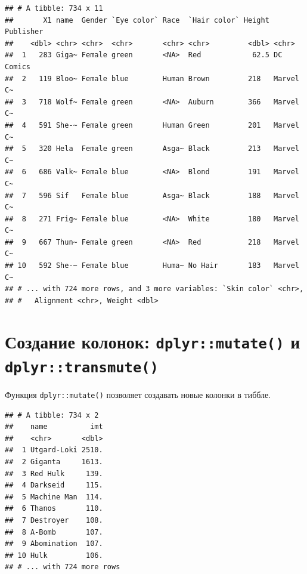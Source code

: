 \documentclass[]{book}
\newenvironment{Shaded}{\begin{snugshade}}{\end{snugshade}}
\newcommand{\KeywordTok}[1]{\textcolor[rgb]{0.13,0.29,0.53}{\textbf{#1}}}
\newcommand{\DataTypeTok}[1]{\textcolor[rgb]{0.13,0.29,0.53}{#1}}
\newcommand{\DecValTok}[1]{\textcolor[rgb]{0.00,0.00,0.81}{#1}}
\newcommand{\StringTok}[1]{\textcolor[rgb]{0.31,0.60,0.02}{#1}}
\newcommand{\OperatorTok}[1]{\textcolor[rgb]{0.81,0.36,0.00}{\textbf{#1}}}
\newcommand{\NormalTok}[1]{#1}
\begin{document}
\begin{verbatim}
## # A tibble: 734 x 11
##       X1 name  Gender `Eye color` Race  `Hair color` Height Publisher
##    <dbl> <chr> <chr>  <chr>       <chr> <chr>         <dbl> <chr>    
##  1   283 Giga~ Female green       <NA>  Red            62.5 DC Comics
##  2   119 Bloo~ Female blue        Human Brown         218   Marvel C~
##  3   718 Wolf~ Female green       <NA>  Auburn        366   Marvel C~
##  4   591 She-~ Female green       Human Green         201   Marvel C~
##  5   320 Hela  Female green       Asga~ Black         213   Marvel C~
##  6   686 Valk~ Female blue        <NA>  Blond         191   Marvel C~
##  7   596 Sif   Female blue        Asga~ Black         188   Marvel C~
##  8   271 Frig~ Female blue        <NA>  White         180   Marvel C~
##  9   667 Thun~ Female green       <NA>  Red           218   Marvel C~
## 10   592 She-~ Female blue        Huma~ No Hair       183   Marvel C~
## # ... with 724 more rows, and 3 more variables: `Skin color` <chr>,
## #   Alignment <chr>, Weight <dbl>
\end{verbatim}

\section{\texorpdfstring{Создание колонок: \texttt{dplyr::mutate()} и
\texttt{dplyr::transmute()}}{Создание колонок: dplyr::mutate() и dplyr::transmute()}}\label{tidy_mutate}

Функция \texttt{dplyr::mutate()} позволяет создавать новые колонки в
тиббле.

\begin{Shaded}
\end{Shaded}

\begin{verbatim}
## # A tibble: 734 x 2
##    name          imt
##    <chr>       <dbl>
##  1 Utgard-Loki 2510.
##  2 Giganta     1613.
##  3 Red Hulk     139.
##  4 Darkseid     115.
##  5 Machine Man  114.
##  6 Thanos       110.
##  7 Destroyer    108.
##  8 A-Bomb       107.
##  9 Abomination  107.
## 10 Hulk         106.
## # ... with 724 more rows
\end{verbatim}
\end{document}
